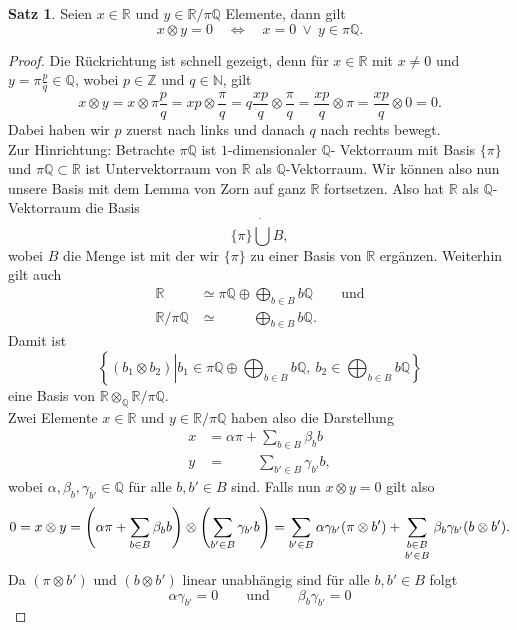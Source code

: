 \documentclass[11pt,titlepage]{article}
\newcommand{\setN}{\mathbb{N}}
\newcommand{\setZ}{\mathbb{Z}}
\newcommand{\setQ}{\mathbb{Q}}
\newcommand{\setR}{\mathbb{R}}
\theoremstyle{definition}
\newtheorem{theorem}{Satz}[section]
\theoremstyle{remark}
\begin{document}
	\begin{theorem} \label{bem:dehn=0}
		Seien $x\in \setR$ und $y\in\setR/\pi\setQ$ Elemente, dann gilt
		\[ x\otimes y =0 \quad \Leftrightarrow \quad x=0 \ \lor\ y\in\pi\setQ.\]
	\end{theorem}
	
	\begin{proof}
		Die Rückrichtung ist schnell gezeigt, 
		denn für $x\in\setR$ mit $x\neq 0$ und $y=\pi\frac{p}{q}\in\setQ$, wobei $p\in\setZ$ und $q\in\setN$, gilt
		\[ x\otimes y =x\otimes\pi \frac{p}{q} =xp\otimes\frac{\pi}{q} =q\frac{xp}{q}
		\otimes\frac{\pi}{q} = \frac{xp}{q}\otimes\pi =\frac{xp}{q}\otimes 0=0.\]
		Dabei haben wir $p$ zuerst nach links und danach $q$ nach rechts bewegt. \\
		Zur Hinrichtung: Betrachte $\pi\setQ$ ist $1$-dimensionaler $\setQ$-
		Vektorraum mit Basis $\{\pi\}$ und $\pi\setQ\subset\setR$ ist 
		Untervektorraum von $\setR$ als $\setQ$-Vektorraum. Wir können also nun 
		unsere Basis mit dem Lemma von Zorn auf ganz $\setR$ fortsetzen. 
		Also hat $\setR$ als $\setQ$-Vektorraum die Basis
		\[\{\pi\}\dot\bigcup B,\]
		wobei $B$ die Menge ist mit der wir $\{\pi\}$ zu einer Basis von $\setR$ 
		ergänzen. Weiterhin gilt auch
		\begin{align*}
			\setR&\simeq\pi\setQ\oplus\bigoplus_{b\in B}b\setQ\qquad\text{und}\\
			\setR /\pi\setQ&\simeq\qquad\ \ \bigoplus_{b\in B}b\setQ.
		\end{align*}
		Damit ist
		\[\left\{(b_1\otimes b_2)\left\vert b_1\in\pi\setQ\oplus\bigoplus_{b\in B}b\setQ,\ b_2\in \bigoplus_{b\in B}b\setQ\right\}\right.\]
		eine Basis von $\setR\otimes_\setQ\setR/\pi\setQ$. \\
		Zwei Elemente $x\in\setR$ und $y\in\setR/\pi\setQ$ haben also die 
		Darstellung
		\begin{align*}
			x&=\alpha\pi+\sum_{b\in B}\beta_b b \\
			y&= \qquad\ \sum_{b'\in B}\gamma_{b'}b,
		\end{align*}
		wobei $\alpha,\beta_b,\gamma_{b'}\in\setQ$ für alle $b,b'\in B$ sind. 
		Falls nun $x\otimes y=0$ gilt also
		\[0=x\otimes y=\left(\alpha\pi+\sum_{b\in B}\beta_b b\right)\otimes
		\left(\sum_{b'\in B}\gamma_{b'}b\right)=\sum_{b'\in 
		B}\alpha\gamma_{b'}(\pi\otimes b')+\sum_{\genfrac{}{}{0pt}{1}{b\in B}
		{b'\in B}} \beta_b\gamma_{b'}(b\otimes b').\]
		Da $(\pi\otimes b')$ und $(b\otimes b')$ linear unabhängig sind für alle  
		$b,b'\in B$ folgt
		\[\alpha\gamma_{b'}=0\qquad\text{und}\qquad \beta_b\gamma_{b'}=0\]

\end{proof}
\end{document}
